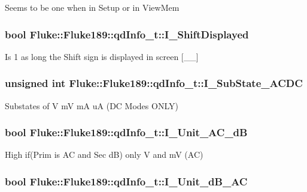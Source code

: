 \label{structFluke_1_1Fluke189_1_1qdInfo__t_aa470149681ea3898d86ddb11306eddd8}
Seems to be one when in Setup or in ViewMem \hypertarget{structFluke_1_1Fluke189_1_1qdInfo__t_ac17c2f1b6bafd6e9559805f1d31e9317}{
\subsubsection[{I\_\-ShiftDisplayed}]{\setlength{\rightskip}{0pt plus 5cm}bool {\bf Fluke::Fluke189::qdInfo\_\-t::I\_\-ShiftDisplayed}}}
\label{structFluke_1_1Fluke189_1_1qdInfo__t_ac17c2f1b6bafd6e9559805f1d31e9317}
Is 1 as long the Shift sign is displayed in screen \mbox{[}\_\-\_\-\mbox{]} \hypertarget{structFluke_1_1Fluke189_1_1qdInfo__t_ad470066c524793dc47a3dcb23618c49a}{
\subsubsection[{I\_\-SubState\_\-ACDC}]{\setlength{\rightskip}{0pt plus 5cm}unsigned int {\bf Fluke::Fluke189::qdInfo\_\-t::I\_\-SubState\_\-ACDC}}}
\label{structFluke_1_1Fluke189_1_1qdInfo__t_ad470066c524793dc47a3dcb23618c49a}
Substates of V mV mA uA (DC Modes ONLY) \hypertarget{structFluke_1_1Fluke189_1_1qdInfo__t_aad69b17c3c85587c57221321aa94d6c5}{
\subsubsection[{I\_\-Unit\_\-AC\_\-dB}]{\setlength{\rightskip}{0pt plus 5cm}bool {\bf Fluke::Fluke189::qdInfo\_\-t::I\_\-Unit\_\-AC\_\-dB}}}
\label{structFluke_1_1Fluke189_1_1qdInfo__t_aad69b17c3c85587c57221321aa94d6c5}
High if(Prim is AC and Sec dB) only V and mV (AC) \hypertarget{structFluke_1_1Fluke189_1_1qdInfo__t_aec06148ae228f11298bf487bcabc630c}{
\subsubsection[{I\_\-Unit\_\-dB\_\-AC}]{\setlength{\rightskip}{0pt plus 5cm}bool {\bf Fluke::Fluke189::qdInfo\_\-t::I\_\-Unit\_\-dB\_\-AC}}}
